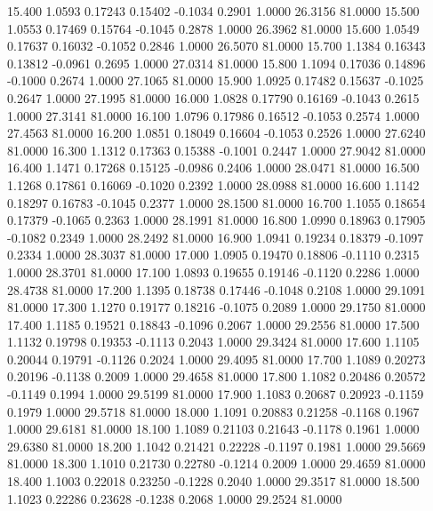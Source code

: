   15.400   1.0593   0.17243   0.15402  -0.1034   0.2901   1.0000  26.3156  81.0000
  15.500   1.0553   0.17469   0.15764  -0.1045   0.2878   1.0000  26.3962  81.0000
  15.600   1.0549   0.17637   0.16032  -0.1052   0.2846   1.0000  26.5070  81.0000
  15.700   1.1384   0.16343   0.13812  -0.0961   0.2695   1.0000  27.0314  81.0000
  15.800   1.1094   0.17036   0.14896  -0.1000   0.2674   1.0000  27.1065  81.0000
  15.900   1.0925   0.17482   0.15637  -0.1025   0.2647   1.0000  27.1995  81.0000
  16.000   1.0828   0.17790   0.16169  -0.1043   0.2615   1.0000  27.3141  81.0000
  16.100   1.0796   0.17986   0.16512  -0.1053   0.2574   1.0000  27.4563  81.0000
  16.200   1.0851   0.18049   0.16604  -0.1053   0.2526   1.0000  27.6240  81.0000
  16.300   1.1312   0.17363   0.15388  -0.1001   0.2447   1.0000  27.9042  81.0000
  16.400   1.1471   0.17268   0.15125  -0.0986   0.2406   1.0000  28.0471  81.0000
  16.500   1.1268   0.17861   0.16069  -0.1020   0.2392   1.0000  28.0988  81.0000
  16.600   1.1142   0.18297   0.16783  -0.1045   0.2377   1.0000  28.1500  81.0000
  16.700   1.1055   0.18654   0.17379  -0.1065   0.2363   1.0000  28.1991  81.0000
  16.800   1.0990   0.18963   0.17905  -0.1082   0.2349   1.0000  28.2492  81.0000
  16.900   1.0941   0.19234   0.18379  -0.1097   0.2334   1.0000  28.3037  81.0000
  17.000   1.0905   0.19470   0.18806  -0.1110   0.2315   1.0000  28.3701  81.0000
  17.100   1.0893   0.19655   0.19146  -0.1120   0.2286   1.0000  28.4738  81.0000
  17.200   1.1395   0.18738   0.17446  -0.1048   0.2108   1.0000  29.1091  81.0000
  17.300   1.1270   0.19177   0.18216  -0.1075   0.2089   1.0000  29.1750  81.0000
  17.400   1.1185   0.19521   0.18843  -0.1096   0.2067   1.0000  29.2556  81.0000
  17.500   1.1132   0.19798   0.19353  -0.1113   0.2043   1.0000  29.3424  81.0000
  17.600   1.1105   0.20044   0.19791  -0.1126   0.2024   1.0000  29.4095  81.0000
  17.700   1.1089   0.20273   0.20196  -0.1138   0.2009   1.0000  29.4658  81.0000
  17.800   1.1082   0.20486   0.20572  -0.1149   0.1994   1.0000  29.5199  81.0000
  17.900   1.1083   0.20687   0.20923  -0.1159   0.1979   1.0000  29.5718  81.0000
  18.000   1.1091   0.20883   0.21258  -0.1168   0.1967   1.0000  29.6181  81.0000
  18.100   1.1089   0.21103   0.21643  -0.1178   0.1961   1.0000  29.6380  81.0000
  18.200   1.1042   0.21421   0.22228  -0.1197   0.1981   1.0000  29.5669  81.0000
  18.300   1.1010   0.21730   0.22780  -0.1214   0.2009   1.0000  29.4659  81.0000
  18.400   1.1003   0.22018   0.23250  -0.1228   0.2040   1.0000  29.3517  81.0000
  18.500   1.1023   0.22286   0.23628  -0.1238   0.2068   1.0000  29.2524  81.0000
